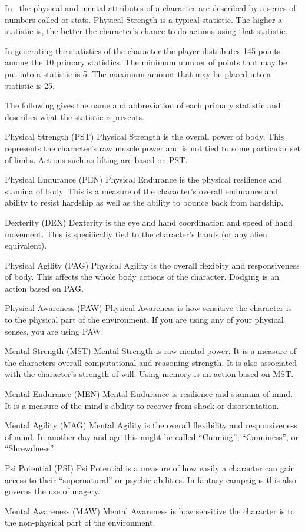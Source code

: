 In \SH\ the physical and mental attributes of a character
are described by a series of numbers called  or stats.
Physical Strength is a typical statistic. The higher a
statistic is, the better the character's chance to do actions using
that statistic.

In generating the statistics of the character the player distributes 
145 points among the 10 primary statistics. The minimum number of points that may be
put into a statistic is 5. The maximum amount that may be placed into
a statistic is 25.

The following gives the name and abbreviation of each primary statistic and
describes what the statistic represents.

\begin{relate}
	\item[Physical Strength	(PST)]
	Physical Strength is the overall power of body. This represents
	the character's raw muscle power and is not tied to some particular
	set of limbs. Actions such as lifting are based on PST.
	\item[Physical Endurance (PEN)]
	Physical Endurance is the physical resilience and stamina of body.
	This is a measure of the character's overall endurance and ability
	to resist hardship as well as the ability to bounce back from hardship.
	\item[Dexterity	(DEX)]
	Dexterity is the eye and hand coordination and speed of hand movement.
	This is	specifically tied to the character's hands (or any alien 
	equivalent).
	\item[Physical Agility (PAG)]
	Physical Agility is the overall flexibity and responsiveness of body.
	This affects the whole body actions of the character. Dodging is 
	an action based on PAG.
	\item[Physical Awareness (PAW)]
	Physical Awareness is how sensitive the character is to
	the physical part of the environment. If you are using any of 
	your physical senses, you are using PAW.
	\item[Mental Strength (MST)]
	Mental Strength is raw mental power. It is a measure of the characters 
	overall computational and reasoning strength. It is also associated with
	the character's strength of will. Using memory is an action based 
	on MST.
	\item[Mental Endurance (MEN)]
	Mental Endurance is resilience and stamina of mind. It is a measure of the
	mind's ability to recover from shock or disorientation.
	\item[Mental Agility (MAG)]
	Mental Agility is the overall flexibility and responsiveness of mind.
	In another day and age this might be called ``Cunning'', 
	``Canniness'', or ``Shrewdness''.
	\item[Psi Potential (PSI)]
	Psi Potential is a measure of how easily a character can gain access to
	their ``supernatural'' or psychic abilities. In fantasy campaigns 
	this also governs the use of magery.
	\item[Mental Awareness (MAW)]
	Mental Awareness is how sensitive the character is to
	the non-physical part of the environment. 
\end{relate}

